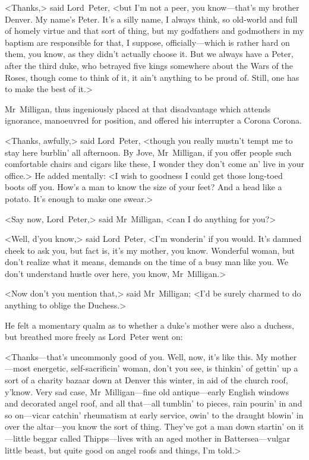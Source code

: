<Thanks,> said Lord~Peter, <but I'm not a peer, you know—that's my brother Denver. My name's Peter. It's a silly name, I always think, so old-world and full of homely virtue and that sort of thing, but my godfathers and godmothers in my baptism are responsible for that, I suppose, officially—which is rather hard on them, you know, as they didn't actually choose it. But we always have a Peter, after the third duke, who betrayed five kings somewhere about the Wars of the Roses, though come to think of it, it ain't anything to be proud of. Still, one has to make the best of it.>

Mr~Milligan, thus ingeniously placed at that disadvantage which attends ignorance, manoeuvred for position, and offered his interrupter a Corona Corona.

<Thanks, awfully,> said Lord~Peter, <though you really mustn't tempt me to stay here burblin' all afternoon. By Jove, Mr~Milligan, if you offer people such comfortable chairs and cigars like these, I wonder they don't come an' live in your office.> He added mentally: <I wish to goodness I could get those long-toed boots off you. How's a man to know the size of your feet? And a head like a potato. It's enough to make one swear.>

<Say now, Lord~Peter,> said Mr~Milligan, <can I do anything for you?>

<Well, d'you know,> said Lord~Peter, <I'm wonderin' if you would. It's damned cheek to ask you, but fact is, it's my mother, you know. Wonderful woman, but don't realize what it means, demands on the time of a busy man like you. We don't understand hustle over here, you know, Mr~Milligan.>

<Now don't you mention that,> said Mr~Milligan; <I'd be surely charmed to do anything to oblige the Duchess.>

He felt a momentary qualm as to whether a duke's mother were also a duchess, but breathed more freely as Lord~Peter went on:

<Thanks—that's uncommonly good of you. Well, now, it's like this. My mother—most energetic, self-sacrificin' woman, don't you see, is thinkin' of gettin' up a sort of a charity bazaar down at Denver this winter, in aid of the church roof, y'know. Very sad case, Mr~Milligan—fine old antique—early English windows and decorated angel roof, and all that—all tumblin' to pieces, rain pourin' in and so on—vicar catchin' rheumatism at early service, owin' to the draught blowin' in over the altar—you know the sort of thing. They've got a man down startin' on it—little beggar called Thipps—lives with an aged mother in Battersea—vulgar little beast, but quite good on angel roofs and things, I'm told.>

